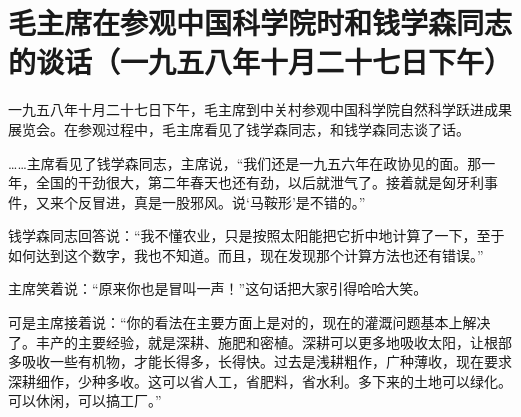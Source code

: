 \section[毛主席在参观中国科学院时和钱学森同志的谈话（一九五八年十月二十七日下午）]{毛主席在参观中国科学院时和钱学森同志的谈话（一九五八年十月二十七日下午）}


一九五八年十月二十七日下午，毛主席到中关村参观中国科学院自然科学跃进成果展览会。在参观过程中，毛主席看见了钱学森同志，和钱学森同志谈了话。

……主席看见了钱学森同志，主席说，“我们还是一九五六年在政协见的面。那一年，全国的干劲很大，第二年春天也还有劲，以后就泄气了。接着就是匈牙利事件，又来个反冒进，真是一股邪风。说‘马鞍形’是不错的。”

钱学森同志回答说：“我不懂农业，只是按照太阳能把它折中地计算了一下，至于如何达到这个数字，我也不知道。而且，现在发现那个计算方法也还有错误。”

主席笑着说：“原来你也是冒叫一声！”这句话把大家引得哈哈大笑。

可是主席接着说：“你的看法在主要方面上是对的，现在的灌溉问题基本上解决了。丰产的主要经验，就是深耕、施肥和密植。深耕可以更多地吸收太阳，让根部多吸收一些有机物，才能长得多，长得快。过去是浅耕粗作，广种薄收，现在要求深耕细作，少种多收。这可以省人工，省肥料，省水利。多下来的土地可以绿化。可以休闲，可以搞工厂。”


